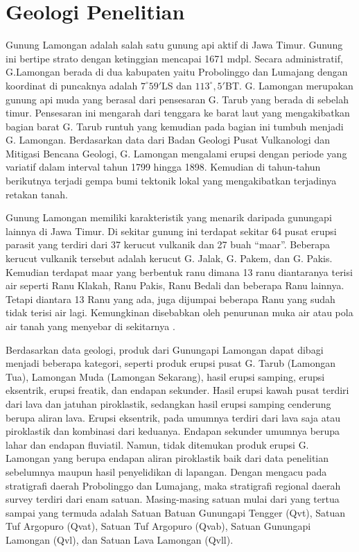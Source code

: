 \section{Geologi Penelitian}
\hspace{25pt}Gunung Lamongan adalah salah satu gunung api aktif di Jawa Timur. Gunung ini bertipe strato dengan ketinggian mencapai 1671 mdpl. Secara administratif, G.Lamongan berada di dua kabupaten yaitu Probolinggo dan Lumajang dengan koordinat di puncaknya adalah $7^{\circ}59'$LS dan $113^{\circ},5'$BT. G. Lamongan merupakan gunung api muda yang berasal dari pensesaran G. Tarub yang berada di sebelah timur. Pensesaran ini mengarah dari tenggara ke barat laut yang mengakibatkan bagian barat G. Tarub runtuh yang kemudian pada bagian ini tumbuh menjadi G. Lamongan. Berdasarkan data dari Badan Geologi Pusat Vulkanologi dan Mitigasi Bencana Geologi, G. Lamongan mengalami erupsi dengan periode yang variatif dalam interval tahun 1799 hingga 1898. Kemudian di tahun-tahun berikutnya terjadi gempa bumi tektonik lokal yang mengakibatkan terjadinya retakan tanah\citep{GLamongan}. 

\hspace{25pt} Gunung Lamongan memiliki karakteristik yang menarik daripada gunungapi lainnya di Jawa Timur. Di sekitar gunung ini terdapat sekitar 64 pusat erupsi parasit yang terdiri dari 37 kerucut vulkanik dan 27 buah “maar”. Beberapa kerucut vulkanik tersebut adalah kerucut G. Jalak, G. Pakem, dan G. Pakis. Kemudian terdapat maar yang berbentuk ranu dimana 13 ranu diantaranya terisi air seperti Ranu Klakah, Ranu Pakis, Ranu Bedali dan beberapa Ranu lainnya. Tetapi diantara 13 Ranu yang ada, juga dijumpai beberapa Ranu yang sudah tidak terisi air lagi. Kemungkinan disebabkan oleh penurunan muka air atau pola air tanah yang menyebar di sekitarnya \cite{GLamongan}. 

\hspace{25pt} Berdasarkan data geologi, produk dari Gunungapi Lamongan dapat dibagi menjadi beberapa kategori, seperti produk erupsi pusat G. Tarub (Lamongan Tua), Lamongan Muda (Lamongan Sekarang), hasil erupsi samping, erupsi eksentrik, erupsi freatik, dan endapan sekunder. Hasil erupsi kawah pusat terdiri dari lava dan jatuhan piroklastik, sedangkan hasil erupsi samping cenderung berupa aliran lava. Erupsi eksentrik, pada umumnya terdiri dari lava saja atau piroklastik dan kombinasi dari keduanya. Endapan sekunder umumnya berupa lahar dan endapan fluviatil. Namun, tidak ditemukan produk erupsi G. Lamongan yang berupa endapan aliran piroklastik baik dari data penelitian sebelumnya maupun hasil penyelidikan di lapangan. Dengan mengacu pada stratigrafi daerah Probolinggo dan Lumajang, maka stratigrafi regional daerah survey terdiri dari enam satuan. Masing-masing satuan mulai dari yang tertua sampai yang termuda adalah Satuan Batuan Gunungapi Tengger (Qvt), Satuan Tuf Argopuro (Qvat), Satuan Tuf Argopuro (Qvab), Satuan Gunungapi Lamongan (Qvl), dan Satuan Lava Lamongan (Qvll)\cite{GLamongan}.

